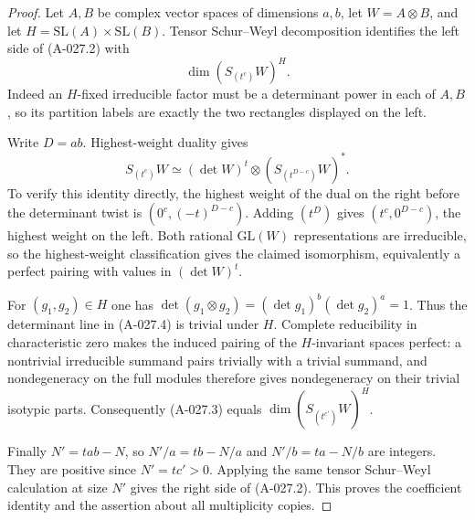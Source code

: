 \begin{proof}
Let $A,B$ be complex vector spaces of dimensions $a,b$,
let $W=A\otimes B$, and let $H=\mathrm{SL}(A)\times\mathrm{SL}(B)$.
Tensor Schur--Weyl decomposition identifies the left side of
(A-027.2) with
\[
                         \dim(S_{(t^c)}W)^H.             \tag{A-027.3}
\]
Indeed an $H$-fixed irreducible factor must be a determinant
power in each of $A,B$, so its partition labels are exactly
the two rectangles displayed on the left.

Write $D=ab$. Highest-weight duality gives
\[
            S_{(t^c)}W\simeq(\det W)^t
                                      \otimes(S_{(t^{D-c})}W)^*.
                                                               \tag{A-027.4}
\]
To verify this identity directly, the highest weight of
the dual on the right before the determinant twist is
$(0^c,(-t)^{D-c})$. Adding $(t^D)$ gives
$(t^c,0^{D-c})$, the highest weight on the left.
Both rational $\mathrm{GL}(W)$ representations are
irreducible, so the highest-weight classification gives
the claimed isomorphism, equivalently a perfect pairing
with values in $(\det W)^t$.

For $(g_1,g_2)\in H$ one has
$\det(g_1\otimes g_2)=(\det g_1)^b(\det g_2)^a=1$.
Thus the determinant line in (A-027.4) is trivial under $H$.
Complete reducibility in characteristic zero makes the
induced pairing of the $H$-invariant spaces perfect: a
nontrivial irreducible summand pairs trivially with a
trivial summand, and nondegeneracy on the full modules
therefore gives nondegeneracy on their trivial isotypic parts.
Consequently (A-027.3) equals
$\dim(S_{(t^{c'})}W)^H$.

Finally $N'=tab-N$, so $N'/a=tb-N/a$ and
$N'/b=ta-N/b$ are integers. They are positive since
$N'=tc'>0$. Applying the same tensor Schur--Weyl
calculation at size $N'$ gives the right side of
(A-027.2). This proves the coefficient identity and the
assertion about all multiplicity copies.
\end{proof}

